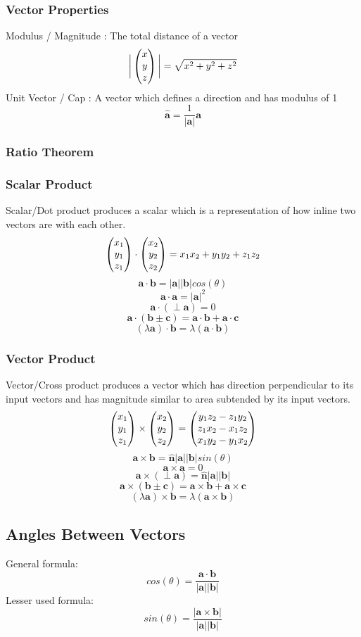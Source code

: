\documentclass[../main]{subfiles}
\newcommand*\colvec[3][]{
    \begin{pmatrix}\ifx\relax#1\relax\else#1\\\fi#2\\#3\end{pmatrix}
}
\begin{document}
	\subsubsection{Vector Properties}
	Modulus / Magnitude : The total distance of a vector
	\[ \bigg|\colvec[x]{y}{z}\bigg| = \sqrt{x^2+y^2+z^2} \]
	Unit Vector / Cap : A vector which defines a direction and has modulus of 1
	\[ \mathbf{\hat{a}} = \frac{1}{|\mathbf{a}|}\mathbf{a} \]
	\subsubsection{Ratio Theorem}
	\subsubsection{Scalar Product}
	Scalar/Dot product produces a scalar which is a representation of how inline two vectors are with each other.
	\[ \colvec[x_1]{y_1}{z_1} \cdot \colvec[x_2]{y_2}{z_2} = x_1x_2 + y_1y_2 + z_1z_2 \]
	\[ \mathbf{a} \cdot \mathbf{b} = | \mathbf{a}| | \mathbf{b}| cos(\theta) \]
	\[ \mathbf{a} \cdot \mathbf{a} = | \mathbf{a}| ^2 \]
	\[ \mathbf{a} \cdot (\perp \mathbf{a}) = 0 \]
	\[ \mathbf{a} \cdot (\mathbf{b \pm c}) = \mathbf{a} \cdot \mathbf{b} + \mathbf{a} \cdot \mathbf{c} \]
	\[ (\lambda \mathbf{a}) \cdot \mathbf{b} = \lambda (\mathbf{a} \cdot \mathbf{b}) \]
	\subsubsection{Vector Product}
	Vector/Cross product produces a vector which has direction perpendicular to its input vectors and has magnitude similar to area subtended by its input vectors.
	\[ \colvec[x_1]{y_1}{z_1} \times \colvec[x_2]{y_2}{z_2} = \colvec[y_1z_2-z_1y_2]{z_1x_2-x_1z_2}{x_1y_2-y_1x_2} \]
	\[ \mathbf{a} \times \mathbf{b} = \mathbf{\hat{n}}| \mathbf{a}| | \mathbf{b}| sin(\theta) \]
	\[ \mathbf{a} \times \mathbf{a} = 0 \]
	\[ \mathbf{a} \times (\perp \mathbf{a}) = \mathbf{\hat{n}}| \mathbf{a}| | \mathbf{b}|  \]
	\[ \mathbf{a} \times (\mathbf{b \pm c}) = \mathbf{a} \times \mathbf{b} + \mathbf{a} \times \mathbf{c} \]
	\[ (\lambda \mathbf{a}) \times \mathbf{b} = \lambda (\mathbf{a} \times \mathbf{b}) \]

\subsection{Angles Between Vectors}
	General formula:
	\[ cos(\theta) = \frac{\mathbf{a} \cdot \mathbf{b}}{|\mathbf{a}||\mathbf{b}|} \]
	Lesser used formula:
	\[ sin(\theta) = \frac{|\mathbf{a} \times \mathbf{b}|}{|\mathbf{a}||\mathbf{b}|} \]
\end{document}
